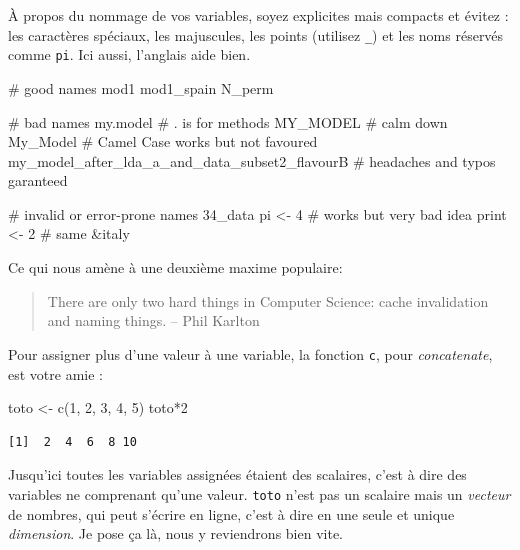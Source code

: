 \documentclass[
  letterpaper,
  DIV=11,
  numbers=noendperiod]{scrreprt}
\newenvironment{Shaded}{\begin{snugshade}}{\end{snugshade}}
\newcommand{\CommentTok}[1]{\textcolor[rgb]{0.37,0.37,0.37}{#1}}
\newcommand{\DecValTok}[1]{\textcolor[rgb]{0.68,0.00,0.00}{#1}}
\newcommand{\FunctionTok}[1]{\textcolor[rgb]{0.28,0.35,0.67}{#1}}
\newcommand{\NormalTok}[1]{\textcolor[rgb]{0.00,0.23,0.31}{#1}}
\newcommand{\OtherTok}[1]{\textcolor[rgb]{0.00,0.23,0.31}{#1}}
\newcommand{\SpecialCharTok}[1]{\textcolor[rgb]{0.37,0.37,0.37}{#1}}
\begin{document}
À propos du nommage de vos variables, soyez explicites mais compacts et
évitez : les caractères spéciaux, les majuscules, les points (utilisez
\texttt{\_}) et les noms réservés comme \texttt{pi}. Ici aussi,
l'anglais aide bien.

\begin{Shaded}
\begin{Highlighting}[]
\CommentTok{\# good names}
\NormalTok{mod1}
\NormalTok{mod1\_spain}
\NormalTok{N\_perm}

\CommentTok{\# bad names}
\NormalTok{my.model }\CommentTok{\# . is for methods}
\NormalTok{MY\_MODEL }\CommentTok{\# calm down}
\NormalTok{My\_Model }\CommentTok{\# Camel Case works but not favoured}
\NormalTok{my\_model\_after\_lda\_a\_and\_data\_subset2\_flavourB }\CommentTok{\# headaches and typos garanteed}

\CommentTok{\# invalid or error{-}prone names}
\NormalTok{34\_data }
\NormalTok{pi }\OtherTok{\textless{}{-}} \DecValTok{4}    \CommentTok{\# works but very bad idea}
\NormalTok{print }\OtherTok{\textless{}{-}} \DecValTok{2} \CommentTok{\# same}
\SpecialCharTok{\&}\NormalTok{italy}
\end{Highlighting}
\end{Shaded}

Ce qui nous amène à une deuxième maxime populaire:

\begin{quote}
There are only two hard things in Computer Science: cache invalidation
and naming things. -- Phil Karlton
\end{quote}

Pour assigner plus d'une valeur à une variable, la fonction \texttt{c},
pour \emph{concatenate}, est votre amie :

\begin{Shaded}
\begin{Highlighting}[]
\NormalTok{toto }\OtherTok{\textless{}{-}} \FunctionTok{c}\NormalTok{(}\DecValTok{1}\NormalTok{, }\DecValTok{2}\NormalTok{, }\DecValTok{3}\NormalTok{, }\DecValTok{4}\NormalTok{, }\DecValTok{5}\NormalTok{)}
\NormalTok{toto}\SpecialCharTok{*}\DecValTok{2}
\end{Highlighting}
\end{Shaded}

\begin{verbatim}
[1]  2  4  6  8 10
\end{verbatim}

Jusqu'ici toutes les variables assignées étaient des scalaires, c'est à
dire des variables ne comprenant qu'une valeur. \texttt{toto} n'est pas
un scalaire mais un \emph{vecteur} de nombres, qui peut s'écrire en
ligne, c'est à dire en une seule et unique \emph{dimension}. Je pose ça
là, nous y reviendrons bien vite.
\end{document}
